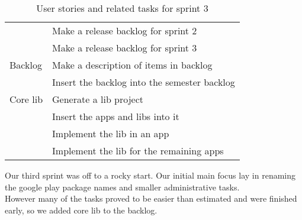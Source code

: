 \begin{table}
\begin{tabular}{ll}
		& Make a release backlog for sprint 2 \\
		& Make a release backlog for sprint 3 \\ \hline
		Backlog & Make a description of items in backlog \\
		& Insert the backlog into the semester backlog \\ \hline
		Core lib & Generate a lib project \\
		& Insert the apps and libs into it \\
		& Implement the lib in an app \\
		& Implement the lib for the remaining apps \\ \hline
	\end{tabular}
	\caption{User stories and related tasks for sprint 3}
	\label{Sprint3_UserStories3_table}
\end{table}

Our third sprint was off to a rocky start. Our initial main focus lay in renaming the google play package names and smaller administrative tasks.\\
However many of the tasks proved to be easier than estimated and were finished early, so we added core lib to the backlog.\\
